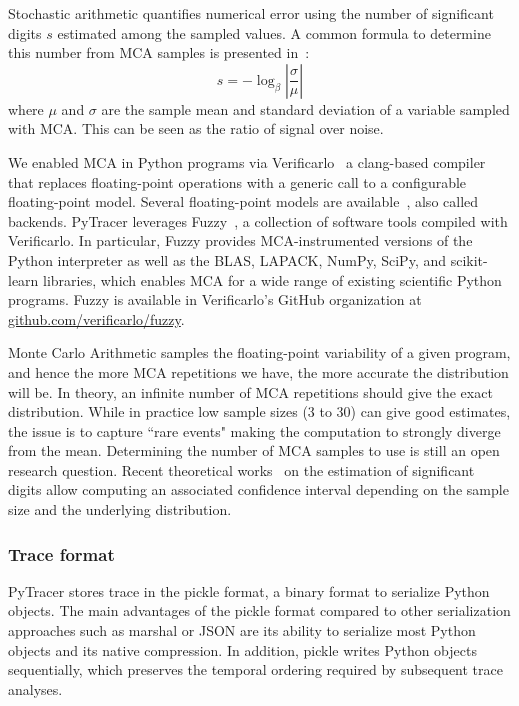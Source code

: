 \documentclass[10pt,journal,compsoc]{IEEEtran}
\newcommand{\pytracer}[0]{PyTracer\xspace}
\begin{document}
Stochastic arithmetic quantifies numerical error using the number of significant
digits $s$ estimated among the sampled values. A common formula to determine
this number from MCA samples is presented in~\cite{parker1997monte}:
\begin{equation}
    s = -\log_{\beta}{ \left| \dfrac{\sigma}{\mu} \right|} \label{eq:sig-digits}
\end{equation}
where $\mu$ and $\sigma$ are the sample mean and standard deviation of a
variable sampled with MCA. This can be seen as the ratio of signal over noise.

We enabled MCA in Python programs via Verificarlo~\cite{verificarlo} a
clang-based compiler~\cite{lattner2008llvm} that replaces floating-point
operations with a generic call to a configurable floating-point model. Several
floating-point models are
available~\cite{chatelain2019automatic,chatelain2019outils}, also called
backends. \pytracer leverages Fuzzy~\cite{kiar2020comparing}, a collection of
software tools compiled with Verificarlo. In particular, Fuzzy provides
MCA-instrumented versions of the Python interpreter as well as the BLAS, LAPACK,
NumPy, SciPy, and scikit-learn libraries, which enables MCA for a wide range of
existing scientific Python programs. Fuzzy is available in Verificarlo's GitHub
organization at
\href{https://github.com/verificarlo/fuzzy}{\url{github.com/verificarlo/fuzzy}}.


Monte Carlo Arithmetic samples the floating-point variability of a given
program, and hence the more MCA repetitions we have, the more accurate the
distribution will be. In theory, an infinite number of MCA repetitions should
give the exact distribution. While in practice low sample sizes (3 to 30) can
give good estimates, the issue is to capture ``rare events" making the
computation to strongly diverge from the mean. Determining the number of MCA
samples to use is still an open research question. Recent theoretical
works~\cite{sohier2021confidence} on the estimation of significant digits allow
computing an associated confidence interval depending on the sample size and the
underlying distribution.

\subsubsection{Trace format}

\pytracer stores trace in the pickle format, a binary format to serialize Python
objects. The main advantages of the pickle format compared to other
serialization approaches such as marshal or JSON are its ability to serialize
most Python objects and its native compression.  In addition, pickle writes
Python objects sequentially, which preserves the temporal ordering required by
subsequent trace analyses.
\end{document}
